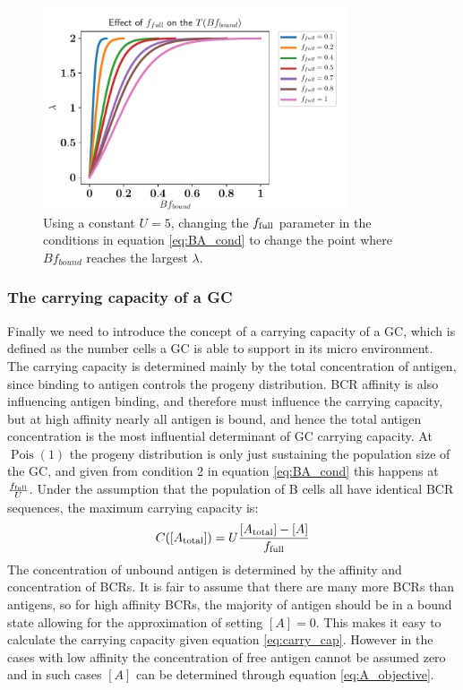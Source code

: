 \begin{figure}
    \centering
    \includegraphics[width=0.8\textwidth]{figures/T_Bfbound_f_full.pdf}
    \caption{
        \label{fig:T_Bfbound_f_full}
        Using a constant $U = 5$, changing the $f_{\text{full}}$ parameter in the conditions in equation \ref{eq:BA_cond} to change the point where $Bf_{bound}$ reaches the largest $\lambda$.
    }
\end{figure}








\subsubsection{The carrying capacity of a GC}
Finally we need to introduce the concept of a carrying capacity of a GC, which is defined as the number cells a GC is able to support in its micro environment.
The carrying capacity is determined mainly by the total concentration of antigen, since binding to antigen controls the progeny distribution.
BCR affinity is also influencing antigen binding, and therefore must influence the carrying capacity, but at high affinity nearly all antigen is bound, and hence the total antigen concentration is the most influential determinant of GC carrying capacity.
At $\operatorname{Pois}(1)$ the progeny distribution is only just sustaining the population size of the GC, and given from condition 2 in equation \ref{eq:BA_cond} this happens at $\frac{f_{\text{full}}}{U}$.
Under the assumption that the population of B cells all have identical BCR sequences, the maximum carrying capacity is:
\begin{equation}
C([A_{\text{total}}]) = U \frac{[A_{\text{total}}] - [A]}{f_{\text{full}}}
  \label{eq:carry_cap}
\end{equation}
The concentration of unbound antigen is determined by the affinity and concentration of BCRs.
It is fair to assume that there are many more BCRs than antigens, so for high affinity BCRs, the majority of antigen should be in a bound state allowing for the approximation of setting $[A]=0$.
This makes it easy to calculate the carrying capacity given equation \ref{eq:carry_cap}.
However in the cases with low affinity the concentration of free antigen cannot be assumed zero and in such cases $[A]$ can be determined through equation \ref{eq:A_objective}.

